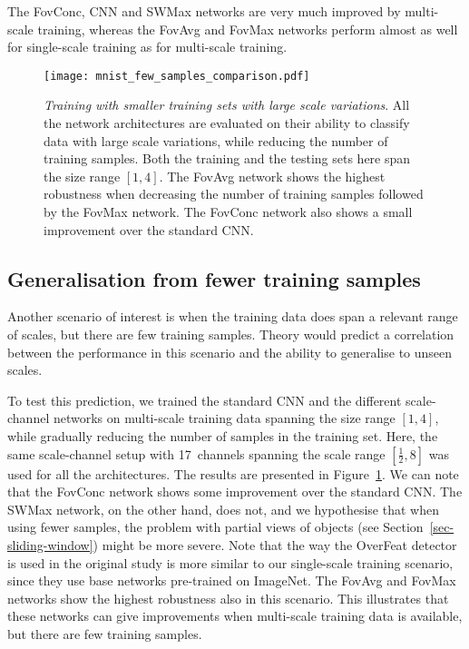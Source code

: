 \documentclass[twocolumn,runningheads]{svjour3}
\begin{document}
  The FovConc, CNN and SWMax networks are very much improved by
  multi-scale training, whereas the FovAvg and FovMax networks perform
  almost as well for single-scale training as for
  multi-scale training.

\begin{figure}[hbpt]
	\begin{center}
		\texttt{[image: mnist\_few\_samples\_comparison.pdf]}		
	\end{center}
	\caption{{\em Training  with smaller training sets with large
            scale variations\/}. All the network architectures are evaluated
          on their ability to classify data with large scale
          variations, while reducing the number of training
          samples. Both the training and the testing sets here span the size
          range $[1,4]$. The Fov\-Avg network shows the highest
          robustness when decreasing the number of training samples
          followed by the FovMax network. 
         The FovConc network also shows a small improvement over the
         standard CNN.}
	\label{fig-mnist_few_samples}
\end{figure}

\subsection{Generalisation from fewer training samples}

Another scenario of interest is when the training data does span a
relevant range of scales, but there are few training samples. Theory
would predict a correlation between the performance in this scenario
and the ability to generalise to unseen scales. 

To test this prediction, we trained the standard CNN and the different
scale-channel networks on multi-scale training data spanning the size
range $[1,4]$, while gradually reducing the number of samples in the
training set. Here, the same scale-channel setup with 17~channels
spanning the scale range $[\frac{1}{2}, 8]$ was used for all the
architectures. The results are presented in
Figure~\ref{fig-mnist_few_samples}.
We can note that the FovConc network
shows some improvement over the standard CNN. The SWMax network, on
the other hand, does not, and we hypothesise that when using fewer
samples, the problem with partial views of objects (see
Section~\ref{sec-sliding-window}) might be more severe.
Note that the way the OverFeat detector is used in the original study
\cite{SerEigZhaMatFerLeC13-arXiv} is more similar to our single-scale
training scenario, since they use base networks pre-trained on
ImageNet.  The FovAvg and FovMax networks show the highest robustness
also in this scenario. This illustrates that these networks can give
improvements when multi-scale training data is available, but there are
few training samples. 
\end{document}

